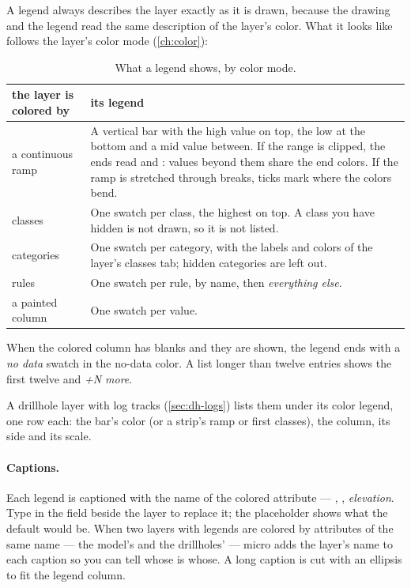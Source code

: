 A legend always describes the layer exactly as it is drawn, because the drawing and the legend read the same description of the layer's color. What it looks like follows the layer's color mode (\cref{ch:color}):

\begin{table}[htbp]\small
\begin{tabularx}{\linewidth}{@{}lL@{}}\toprule
the layer is colored by & its legend \\ \midrule
a continuous ramp & A vertical bar with the high value on top, the low at the bottom and a mid value between. If the range is clipped, the ends read  and : values beyond them share the end colors. If the ramp is stretched through breaks, ticks mark where the colors bend. \\
classes & One swatch per class, the highest on top. A class you have hidden is not drawn, so it is not listed. \\
categories & One swatch per category, with the labels and colors of the layer's classes tab; hidden categories are left out. \\
rules & One swatch per rule, by name, then \emph{everything else}. \\
a painted column & One swatch per value. \\ \bottomrule
\end{tabularx}
\caption{What a legend shows, by color mode.}\label{tab:figures-legends}
\end{table}

When the colored column has blanks and they are shown, the legend ends with a \emph{no data} swatch in the no-data color. A list longer than twelve entries shows the first twelve and \emph{+N more}.

A drillhole layer with log tracks (\cref{sec:dh-logs}) lists them under its color legend, one row each: the bar's color (or a strip's ramp or first classes), the column, its side and its scale.

\paragraph{Captions.} Each legend is captioned with the name of the colored attribute — , , \emph{elevation}. Type in the field beside the layer to replace it; the placeholder shows what the default would be. When two layers with legends are colored by attributes of the same name — the model's  and the drillholes'  — micro adds the layer's name to each caption so you can tell whose is whose. A long caption is cut with an ellipsis to fit the legend column.


